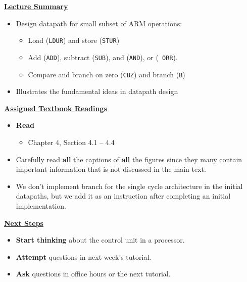\begin{frame}[fragile]
 \underline{\textbf{Lecture Summary}}
 \begin{itemize}
 \item Design datapath for small subset of ARM operations:
\begin{itemize}
\item Load ({\tt LDUR}) and store ({\tt STUR})
\item Add ({\tt ADD}), subtract ({\tt SUB}), and ({\tt AND}), or ({\tt
ORR}).
\item Compare and branch on zero ({\tt CBZ}) and branch ({\tt B})
\end{itemize}
\item Illustrates the fundamental ideas in datapath design 
 \end{itemize}
 \underline{\textbf{Assigned Textbook Readings}}
\begin{itemize}
     \item \textbf{Read} 
     \begin{itemize}
     \item Chapter 4, Section 4.1 -- 4.4

     \end{itemize}
     \item Carefully read \textbf{all} the captions of \textbf{all} the figures  since they many contain important information that is not discussed in the main
text. 

\item We don't implement branch for the single cycle architecture in the initial datapaths, but we add it as an instruction after completing an initial implementation.
     \end{itemize}
    \underline{\textbf{Next Steps}}
    \begin{itemize}
     \item \textbf{Start thinking} about the control unit in a processor. 
\item \textbf{Attempt} questions in next week's tutorial. 
    \item \textbf{Ask} questions in office hours or the next tutorial.
 \end{itemize}

\end{frame}



